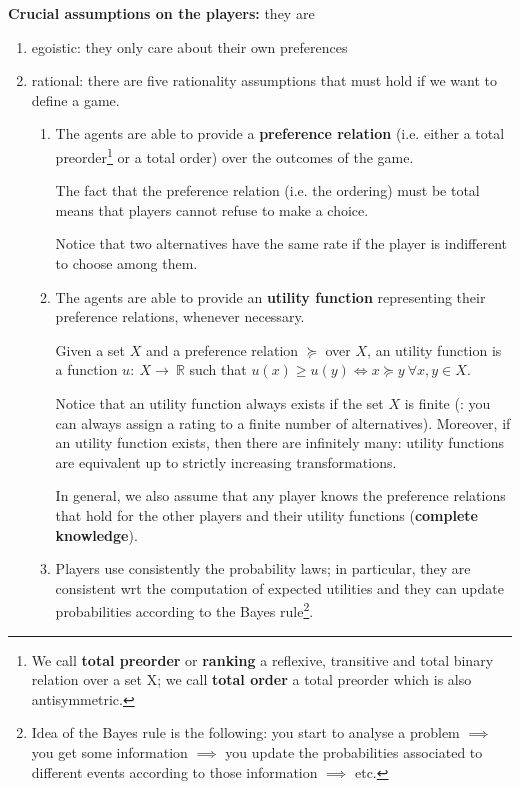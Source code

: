 \noindent \textbf{Crucial assumptions on the players:} they are
\begin{enumerate}
	\item egoistic: they only care about their own preferences
	\item rational: there are five rationality assumptions that must hold if 
	we want to define a game.
	\begin{enumerate}
		\item The agents are able to provide a \textbf{preference relation} 
		(i.e. either a total preorder\footnote{We call \textbf{total preorder} 
		or \textbf{ranking} a reflexive, transitive and total binary relation 
		over a set X; we call \textbf{total order} a total preorder which is 
		also antisymmetric.} 
		or a total order) over the outcomes of the game.

		\noindent The fact that the preference relation (i.e. the ordering) 
		must be total means that players cannot refuse to make a choice.

		\noindent Notice that two alternatives have the same rate if the player 
		is indifferent to choose among them.

		\item The agents are able to provide an \textbf{utility function} 
		representing their preference relations, whenever necessary.

		\noindent Given a set $X$ and a preference relation $\succeq$ over $X$, 
		an utility function is a function $u:~X\rightarrow~\mathbb{R}$ 
		such that $u(x) \geq u(y) \iff x \succeq y ~\forall x,y \in X$.

		\noindent Notice that an utility function always exists if the set $X$ 
		is finite (: you can always assign a rating to a finite number of 
		alternatives). Moreover, if an utility function exists, then there are 
		infinitely many: utility functions are equivalent up to strictly 
		increasing transformations.

		\noindent In general, we also assume that any player knows the 
		preference relations that hold for the other players and their 
		utility functions (\textbf{complete knowledge}).

		\item Players use consistently the probability laws; in particular, 
		they are consistent wrt the computation of expected utilities and 
		they can update probabilities according to the Bayes 
		rule\footnote{Idea of the Bayes rule is the following: you start to 
		analyse a problem $\implies$ you get some information $\implies$ you 
		update the probabilities associated to different events according to 
		those information $\implies$ etc.}.


\end{enumerate}
\end{enumerate}
